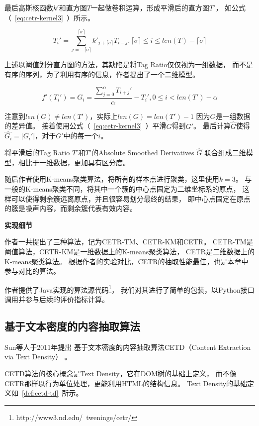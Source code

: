 最后高斯核函数$k'$和直方图$T$一起做卷积运算，形成平滑后的直方图$T'$，
如公式（~\ref{eq:cetr-kernel3}~）所示。

\begin{equation}
\label{eq:cetr-kernel3}
T_i' = \sum_{j=-\lceil \sigma \rceil}^{\lceil \sigma \rceil}
k'_{j+\lceil \sigma \rceil} T_{i-j},
\lceil \sigma \rceil \leq i \leq len(T)-\lceil \sigma \rceil
\end{equation}

上述以阈值划分直方图的方法，其缺陷是将Tag Ratio仅仅视为一组数据，
而不是有序的序列，为了利用有序的信息，作者提出了一个二维模型。

\begin{equation}
\label{eq:cetr-kernel4}
f'(T_i')=G_i=\frac{\sum_{j=0}^{\alpha} T_{i+j}'}{\alpha} - T_i',
0 \leq i < len(T') - \alpha
\end{equation}

注意到$len(G) \neq len(T')$，实际上$len(G)=len(T')-1$
因为$G$是一组数据的差异值。
接着使用公式（~\ref{eq:cetr-kernel3}~）平滑$G$得到$G'$。
最后计算$\hat{G}$使得$\hat{G_i}=\vert G_i' \vert$，对于$G'$中的每一个$i$。

将平滑后的Tag Ratio $T'$和$T'$的Absolute Smoothed Derivatives $\hat{G}$
联合组成二维模型，相比于一维数据，更加具有区分度。

随后作者使用K-means聚类算法，将所有的样本点进行聚类，这里使用$k=3$。
与一般的K-means聚类不同，将其中一个簇的中心点固定为二维坐标系的原点，
这样可以使得剩余簇远离原点，并且很容易划分最终的结果，
即中心点固定在原点的簇是噪声内容，而剩余簇代表有效内容。

\textbf{实现细节}

作者一共提出了三种算法，记为CETR-TM、CETR-KM和CETR。
CETR-TM是阈值算法，CETR-KM是一维数据上的K-means聚类算法，
CETR是二维数据上的K-means聚类算法。
根据作者的实验对比，CETR的抽取性能最佳，也是本章中参与对比的算法。

作者提供了Java实现的算法源代码\footnote{http://www3.nd.edu/~tweninge/cetr/}，
我们对其进行了简单的包装，以Python接口调用并参与后续的评价指标计算。

\subsection{基于文本密度的内容抽取算法}
Sun等人于2011年提出
基于文本密度的内容抽取算法CETD（Content Extraction via Text Density）
。

CETD算法的核心概念是Text Density，它在DOM树的基础上定义，
而不像CETR那样以行为单位处理，更能利用HTML的结构信息。
Text Density的基础定义如~\ref{def:cetd-td}~所示。


